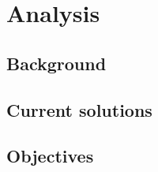 \documentclass{article}
\begin{document}
\newpage
{}

\section{Analysis}
\subsection{Background}
\subsection{Current solutions}
\subsection{Objectives}
\end{document}

